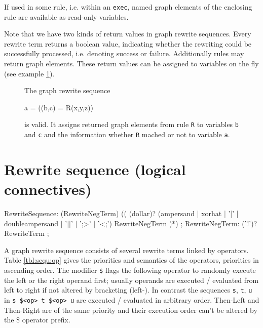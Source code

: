 If used in some rule, i.e. within an \texttt{exec}, named graph elements of the enclosing rule are available as read-only variables.

Note that we have two kinds of return values in graph rewrite sequences.
Every rewrite term returns a boolean value, indicating whether the rewriting could be successfully processed, i.e. denoting success or failure.
Additionally rules may return graph elements.
These return values can be assigned to variables on the fly (see example \ref{ex:grsreturn}).
\begin{figure}[htbp]
\begin{example}
	\label{ex:grsreturn}
	The graph rewrite sequence
	\begin{grgen}	 
a = ((b,c) = R(x,y,z))
	\end{grgen}
	is valid. 
	It assigns returned graph elements from rule \texttt{R} to variables \texttt{b} and \texttt{c} and the information whether \texttt{R} mached or not to variable \texttt{a}.
\end{example}
\end{figure}


\section{Rewrite sequence (logical connectives)}

\makeatletter

\begin{rail}
  RewriteSequence: 
    (RewriteNegTerm) (( (dollar)? (ampersand | xorhat | '|' | doubleampersand | '||' | ';>' | '<;') RewriteNegTerm )*)
	;
  RewriteNegTerm: 
    ('!')? RewriteTerm
	;
\end{rail}

A graph rewrite sequence consists of several rewrite terms linked by operators.
Table \ref{tbl:sequ:op} gives the priorities and semantics of the operators, priorities in ascending order.
The modifier \texttt{\$} flags the following operator to randomly execute the left or the right operand first;
usually operands are executed / evaluated from left to right if not altered by bracketing (left-). 
In contrast the sequences \texttt{s}, \texttt{t}, \texttt{u} in \texttt{s \$<op> t \$<op> u} are executed / evaluated in arbitrary order.
Then-Left and Then-Right are of the same priority and their execution order can't be altered by the \$ operator prefix.

